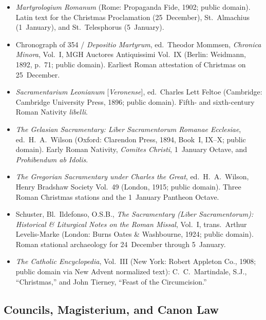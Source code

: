 \begin{itemize}
(Edinburgh and London: William Blackwood and Sons, 1908; public domain). English
text for \textit{Alma Redemptoris Mater} (pp.~210--211), the Christmas Eve
\textit{Kalenda} (p.~269), the Christmas and Octave Offices, 1~January
Martyrology (p.~309), 1~January Collect (p.~315), and Matins patristic lessons
(pp.~271--315), the hymns translated by R.~F.~Littledale (pp.~278--279),
J.~M.~Neale (pp.~296--297), and Edward Caswall (pp.~365--372), and the Most Holy
Name Collect and Office (pp.~365--373).
\item \textit{Martyrologium Romanum} (Rome: Propaganda Fide, 1902; public
domain). Latin text for the Christmas Proclamation (25~December), St.~Almachius
(1~January), and St.~Telesphorus (5~January).
\item Chronograph of 354 / \textit{Depositio Martyrum}, ed.\ Theodor Mommsen,
\textit{Chronica Minora}, Vol.~I, MGH Auctores Antiquissimi Vol.~IX (Berlin:
Weidmann, 1892, p.~71; public domain). Earliest Roman attestation of Christmas
on 25~December.
\item \textit{Sacramentarium Leonianum} [\textit{Veronense}], ed.\ Charles
Lett Feltoe (Cambridge: Cambridge University Press, 1896; public domain).
Fifth- and sixth-century Roman Nativity \textit{libelli}.
\item \textit{The Gelasian Sacramentary: Liber Sacramentorum Romanae Ecclesiae},
ed.\ H.~A.~Wilson (Oxford: Clarendon Press, 1894, Book~I, IX--X; public domain).
Early Roman Nativity, \textit{Comites Christi}, 1~January Octave, and
\textit{Prohibendum ab Idolis}.
\item \textit{The Gregorian Sacramentary under Charles the Great}, ed.\
H.~A.~Wilson, Henry Bradshaw Society Vol.~49 (London, 1915; public domain).
Three Roman Christmas stations and the 1~January Pantheon Octave.
\item Schuster, Bl.~Ildefonso, O.S.B., \textit{The Sacramentary (Liber
Sacramentorum): Historical \& Liturgical Notes on the Roman Missal}, Vol.~I,
trans.\ Arthur Levelis-Marke (London: Burns Oates \& Washbourne, 1924; public
domain). Roman stational archaeology for 24~December through 5~January.
\item \textit{The Catholic Encyclopedia}, Vol.~III (New York: Robert Appleton
Co., 1908; public domain via New Advent normalized text): C.~C.~Martindale,
S.J., ``Christmas,'' and John Tierney, ``Feast of the Circumcision.''
\end{itemize}

\subsection{Councils, Magisterium, and Canon Law}


